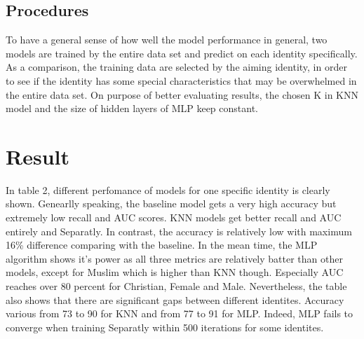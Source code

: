 \documentclass[11pt,twocolumn]{article}
\begin{document}
\subsection{Procedures}
To have a general sense of how well the model performance in general, two models are trained by the entire data set and predict on each identity specifically. As a comparison, the training data are selected by the aiming identity, in order to see if the identity has some special characteristics that may be overwhelmed in the entire data set. On purpose of better evaluating results, 
the chosen K in KNN model and the size of hidden layers of MLP keep constant. 




\section{Result}
In table 2, different perfomance of models for one specific identity is clearly shown. Genearlly speaking, the baseline model gets a very high accuracy but extremely low recall and AUC scores.
KNN models get better recall and AUC entirely and Separatly. In contrast, the accuracy is relatively low with maximum 16\% difference comparing with the baseline. In the mean time, the MLP algorithm 
shows it's power as all three metrics are relatively batter than other models, except for Muslim which is higher than KNN though. Especially AUC reaches over 80 percent for Christian, Female and Male.
\bigbreak
Nevertheless, the table also shows that there are significant gaps between different identites. Accuracy various from 73 to 90 for KNN and from 77 to 91 for MLP. Indeed, MLP fails to converge when training 
Separatly within 500 iterations for some identites.
\end{document}
